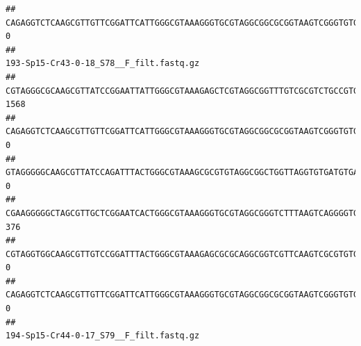 \documentclass[]{article}
\begin{document}
\begin{verbatim}
## CAGAGGTCTCAAGCGTTGTTCGGATTCATTGGGCGTAAAGGGTGCGTAGGCGGCGCGGTAAGTCGGGTGTGAAATCTCGGGGCTTAACTCCGAAACTGCATTCGATACTGCCGTGCTTGAGGACTGGAGAGGAGACTGGAATTTACGGTGTAGCGGTGAAATGCGTAGATATCGTAAGGAAGACCAGTGGCGAAGGCGGGTCTCTGGACAGTTCCTGACGCTGAGGCACGAAGGCCAGGGGAGCAAACG                                       0
##                                                                                                                                                                                                                                                           193-Sp15-Cr43-0-18_S78__F_filt.fastq.gz
## CGTAGGGCGCAAGCGTTATCCGGAATTATTGGGCGTAAAGAGCTCGTAGGCGGTTTGTCGCGTCTGCCGTGAAAGTCCGGGGCTCAACTCCGGATCTGCGGTGGGTACGGGCAGACTAGAGTGATGTAGGGGAGACTGGAATTCCTGGTGTAGCGGTGAAATGCGCAGATATCAGGAGGAACACCGATGGCGAAGGCAGGTCTCTGGGCATTAACTGACGCTGAGGAGCGAAAGCATGGGGAGCGAACA                                    1568
## CAGAGGTCTCAAGCGTTGTTCGGATTCATTGGGCGTAAAGGGTGCGTAGGCGGCGCGGTAAGTCGGGTGTGAAATCTCGGAGCTTAACTCCGAAACTGCATTCGATACTGCCGTGCTTGAGGACTGGAGAGGAGACTGGAATTTACGGTGTAGCGGTGAAATGCGTAGATATCGTAAGGAAGACCAGTGGCGAAGGCGGGTCTCTGGACAGTTCCTGACGCTGAGGCACGAAGGCCAGGGGAGCAAACG                                       0
## GTAGGGGGCAAGCGTTATCCAGATTTACTGGGCGTAAAGCGCGTGTAGGCGGCTGGTTAGGTGTGATGTGAAATCTTCCGGCTCAACCGGAAAACTGCATTGCAAACCGGCCTGGCTAGAGTGCAGGAGAGGGAAGCGGAATTCCAGGTGTAGCGGTGAAATGCGTAGATATCTGGAGGAACACCAGTGGCGAAGGCGGCTTCCTGGCCTGCAACTGACGCTGAGACGCGAAAGCGTGGGGAGCGAAC                                        0
## CGAAGGGGGCTAGCGTTGCTCGGAATCACTGGGCGTAAAGGGTGCGTAGGCGGGTCTTTAAGTCAGGGGTGAAATCCTGGAGCTCAACTCCAGAACTGCCTTTGATACTGAAGATCTTGAGTTCGGGAGAGGTGAGTGGAACTGCGAGTGTAGAGGTGAAATTCGTAGATATTCGCAAGAACACCAGTGGCGAAGGCGGCTCACTGGCCCGATACTGACGCTGAGGCACGAAAGCGTGGGGAGCAAACA                                     376
## CGTAGGTGGCAAGCGTTGTCCGGATTTACTGGGCGTAAAGAGCGCGCAGGCGGTCGTTCAAGTCGCGTGTGAAAGCCCCCGGCTCAACTGGGGAGGGTCACGCGATACTGATCGACTCGAAGGCAGGAGAGGGTAGTGGAATTCCCGGTGTAGTGGTGAAATGCGTAGATATCGGGAGGAACACCAGTGGCGAAGGCGACTACCTGGCCTGTTCTTGACGCTGAGGCGCGAAAGCTAGGGGAGCAAACG                                       0
## CAGAGGTCTCAAGCGTTGTTCGGATTCATTGGGCGTAAAGGGTGCGTAGGCGGCGCGGTAAGTCGGGTGTGAAATCTCGGGGCTTAACTCCGAAACTGCATTCGATACTGCCGTGCTTGAGGACTGGAGAGGAGACTGGAATTTACGGTGTAGCGGTGAAATGCGTAGATATCGTAAGGAAGACCAGTGGCGAAGGCGGGTCTCTGGACAGTTCCTGACGCTGAGGCACGAAGGCCAGGGGAGCAAACG                                       0
##                                                                                                                                                                                                                                                           194-Sp15-Cr44-0-17_S79__F_filt.fastq.gz

\end{verbatim}
\end{document}
